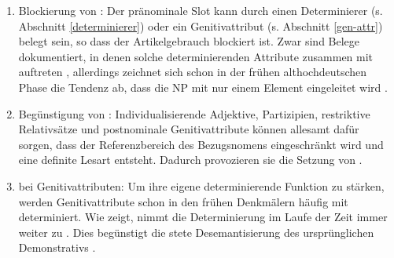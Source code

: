\begin{enumerate}
\item Blockierung von : Der pränominale Slot kann durch einen Determinierer (s. Abschnitt \ref{determinierer}) oder ein Genitivattribut (s. Abschnitt \ref{gen-attr}) belegt sein, so dass der Artikelgebrauch blockiert ist. Zwar sind Belege dokumentiert, in denen solche determinierenden Attribute zusammen  mit  auftreten \parencite[vgl. z.B. die Belegsammlungen in][60--78]{Graf1905},  allerdings zeichnet sich schon in der frühen althochdeutschen Phase die Tendenz ab, dass die NP mit nur einem Element eingeleitet wird \parencite{Oubouzar1997}.
\item Begünstigung von : Individualisierende Adjektive, Partizipien, restriktive Relativsätze und postnominale Genitivattribute können allesamt dafür sorgen, dass der Referenzbereich des Bezugsnomens eingeschränkt wird und eine definite Lesart entsteht. Dadurch provozieren sie die Setzung von  \parencite[24f.]{Schrodt2004}.
\item {} bei Genitivattributen: Um ihre eigene determinierende Funktion zu stärken, werden Genitivattribute schon in den frühen Denkmälern häufig mit  determiniert. Wie \textcite{Oubouzar1989, Oubouzar1992, Oubouzar1997} zeigt, nimmt die Determinierung im Laufe der Zeit immer weiter zu \parencite[185]{Leiss2000}. Dies begünstigt die stete Desemantisierung des ursprünglichen Demonstrativs \parencite{Szczepaniak2015}.
\end{enumerate}


